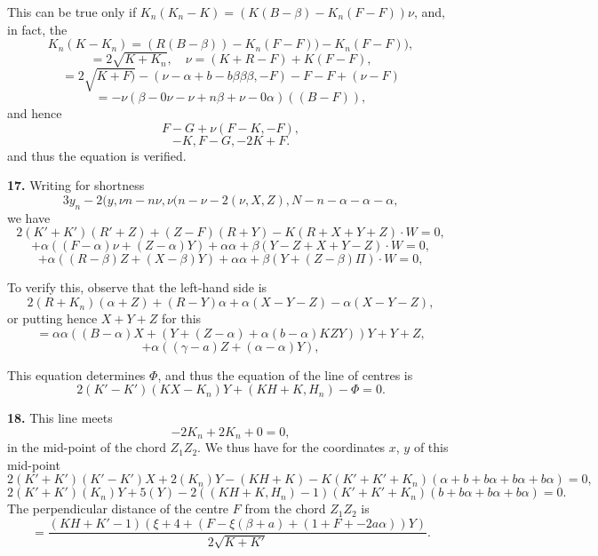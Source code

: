 \documentclass[11pt,a4paper]{article}
\begin{document}
This can be true only if $K_n(K_n - K) = (K(B - \beta) - K_n(F - F))\nu$, and, in fact, the
\[
K_n(K - K_n) = (R(B - \beta)) - K_n(F - F)) - K_n(F - F)),
\]
\[
= 2\sqrt{K + K_n}, \quad \nu = (K + R - F) + K(F - F),
\]
\[
= 2\sqrt{K + F)} - (\nu - \alpha + b - b\beta\beta\beta, - F) - F - F + (\nu - F)
\]
\[
= -\nu(\beta - 0\nu - \nu + n\beta + \nu - 0\alpha)((B - F)),
\]
and hence
\[
F - G + \nu(F - K, - F),
\]
\[
- K, F - G, - 2K + F.
\]
and thus the equation is verified.

\textbf{17.} Writing for shortness
\[
3y_n - 2(y, \nu n - n\nu, \nu(n - \nu - 2(\nu, X, Z), N - n - \alpha - \alpha - \alpha,
\]
we have
\[
2(K' + K')(R' + Z) + (Z - F)(R + Y) - K(R + X + Y + Z) \cdot W = 0,
\]
\[
+ \alpha((F - \alpha)\nu + (Z - \alpha)Y) + \alpha\alpha + \beta(Y - Z + X + Y - Z) \cdot W = 0,
\]
\[
+ \alpha((R - \beta)Z + (X - \beta)Y) + \alpha\alpha + \beta(Y + (Z - \beta)\Pi) \cdot W = 0,
\]

To verify this, observe that the left-hand side is
\[
2(R + K_n)(\alpha + Z) + (R - Y)\alpha + \alpha(X - Y - Z) - \alpha(X - Y - Z),
\]
or putting hence $X + Y + Z$ for this
\[
= \alpha\alpha((B - \alpha)X + (Y + (Z - \alpha) + \alpha(b - \alpha)KZ Y) ) Y + Y + Z,
\]
\[
+ \alpha((\gamma - a)Z + (\alpha - \alpha)Y),
\]

This equation determines $\Phi$, and thus the equation of the line of centres is
\[
2(K' - K')(KX - K_n)Y + (KH + K, H_n) - \Phi = 0.
\]

\textbf{18.} This line meets
\[
- 2K_n + 2K_n + 0 = 0,
\]
in the mid-point of the chord $Z_1 Z_2$. We thus have for the coordinates $x$, $y$ of this mid-point
\[
2(K' + K')(K' - K')X + 2(K_n)Y - (KH + K) - K(K' + K' + K_n)(\alpha + b + b\alpha + b\alpha + b\alpha) = 0,
\]
\[
2(K' + K')(K_n)Y + 5(Y) - 2((KH + K, H_n) - 1)(K' + K' + K_n)(b + b\alpha + b\alpha + b\alpha) = 0.
\]
The perpendicular distance of the centre $F$ from the chord $Z_1 Z_2$ is
\[
= \frac{(KH + K' - 1)(\xi + 4 + (F - \xi(\beta + a) + (1 + F + - 2a\alpha))Y)}{2\sqrt{K + K'}}.
\]
\end{document}
